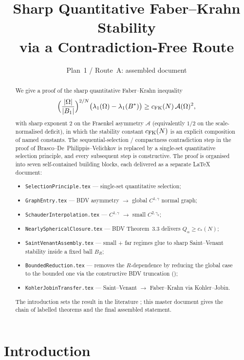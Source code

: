 \documentclass[11pt]{article}
\title{Sharp Quantitative Faber--Krahn Stability\\
       via a Contradiction-Free Route}
\author{Plan~1 / Route~A: assembled document}
\date{}
\theoremstyle{definition}
\newcommand{\Fr}{\mathcal{A}}
\newcommand{\Om}{\Omega}
\begin{document}
\maketitle

\begin{abstract}
We give a proof of the sharp quantitative Faber--Krahn inequality
\[
   \Bigl(\frac{|\Om|}{|B_1|}\Bigr)^{2/N}
   \bigl(\lambda_1(\Om)-\lambda_1(B^*)\bigr)
   \ge c_{\rm FK}(N)\,\Fr(\Om)^2,
\]
with sharp exponent $2$ on the Fraenkel asymmetry $\Fr$ (equivalently
$1/2$ on the scale-normalised deficit), in which the stability constant
$c_{\rm FK}(N)$ is an explicit composition of named constants. The
sequential-selection / compactness contradiction step in the proof of
Brasco--De~Philippis--Velichkov \cite{BDV} is replaced by a
single-set quantitative selection principle, and every subsequent step
is constructive. The proof is organised into seven self-contained
building blocks, each delivered as a separate \LaTeX{} document:
\begin{itemize}
   \item \texttt{SelectionPrinciple.tex} --- single-set quantitative
   selection;
   \item \texttt{GraphEntry.tex} --- BDV asymmetry $\to$ global
   $C^{1,\gamma}$ normal graph;
   \item \texttt{SchauderInterpolation.tex} --- $C^{1,\gamma}$ $\to$
   small $C^{2,\gamma_0}$;
   \item \texttt{NearlySphericalClosure.tex} --- BDV Theorem~3.3
   delivers $Q_\alpha\ge c_*(N)$;
   \item \texttt{SaintVenantAssembly.tex} --- small + far regimes glue
   to sharp Saint--Venant stability inside a fixed ball $B_R$;
   \item \texttt{BoundedReduction.tex} --- removes the
   $R$-dependence by reducing the global case to the bounded one via
   the constructive BDV truncation (\cite[\S5]{BDV});
   \item \texttt{KohlerJobinTransfer.tex} --- Saint--Venant
   $\to$ Faber--Krahn via Kohler--Jobin.
\end{itemize}
The introduction sets the result in the literature
\cite{FMP,BDV,Brasco2014}; this master document gives the chain of
labelled theorems and the final assembled statement.
\end{abstract}

\tableofcontents

\section{Introduction}\label{sec:intro}
\end{document}
